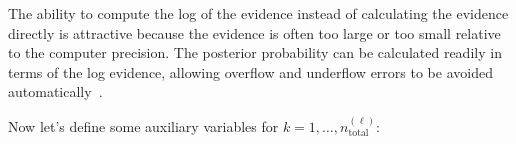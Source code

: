 The ability to compute the log of the evidence instead of calculating the evidence directly is attractive because the evidence
is often too large or too small relative to the computer precision.
%
The posterior probability can be calculated readily in terms of the
log evidence, allowing overflow and underflow errors to be avoided
automatically~\cite{ChOlPr10}.  



Now let's define some auxiliary variables for $k=1,\ldots,n_\text{total}^{(\ell)}$:
    
